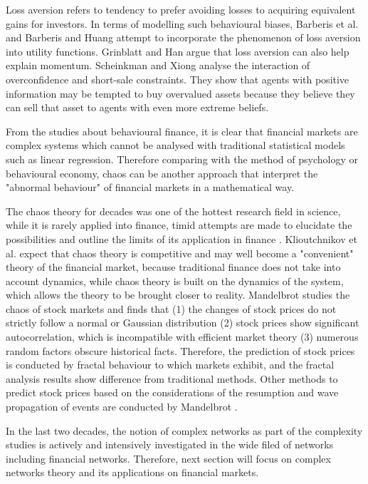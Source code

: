 Loss aversion refers to tendency to prefer avoiding losses to acquiring equivalent gains for investors. In terms of modelling such behavioural biases, Barberis et al. \cite{barberis2001prospect} and Barberis and Huang \cite{barberis2001mental} attempt to incorporate the phenomenon of loss aversion into utility functions. Grinblatt and Han \cite{grinblatt2005prospect} argue that loss aversion can also help explain momentum. Scheinkman and Xiong \cite{scheinkman2003overconfidence} analyse the interaction of overconfidence and short-sale constraints. They show that agents with positive information may be tempted to buy overvalued assets because they believe they can sell that asset to agents with even more extreme beliefs. 

From the studies about behavioural finance, it is clear that financial markets are complex systems which cannot be analysed with traditional statistical models such as linear regression. Therefore comparing with the method of psychology or behavioural economy, chaos can be another approach that interpret the "abnormal behaviour" of financial markets in a mathematical way.

The chaos theory for decades was one of the hottest research field in science, while it is rarely applied into finance, timid attempts are made to elucidate the possibilities and outline the limits of its application in finance \cite{sewell2008chaos}. Klioutchnikov et al. \cite{klioutchnikov2017chaos} expect that chaos theory is competitive and may well become a "convenient" theory of the financial market, because traditional finance does not take into account dynamics, while chaos theory is built on the dynamics of the system, which allows the theory to be brought closer to reality. Mandelbrot \cite{mandelbrot2004mis} studies the chaos of stock markets and finds that (1) the changes of stock prices do not strictly follow a normal or Gaussian distribution (2) stock prices show significant autocorrelation, which is incompatible with efficient market theory (3) numerous random factors obscure historical facts. Therefore, the prediction of stock prices is conducted by fractal behaviour to which markets exhibit, and the fractal analysis results show difference from traditional methods. Other methods to predict stock prices based on the considerations of the resumption and wave propagation of events are conducted by Mandelbrot \cite{mandelbrot1983fractal}.

In the last two decades, the notion of complex networks as part of the complexity studies is actively and intensively investigated in the wide filed of networks including financial networks. Therefore, next section will focus on complex networks theory and its applications on financial markets.

